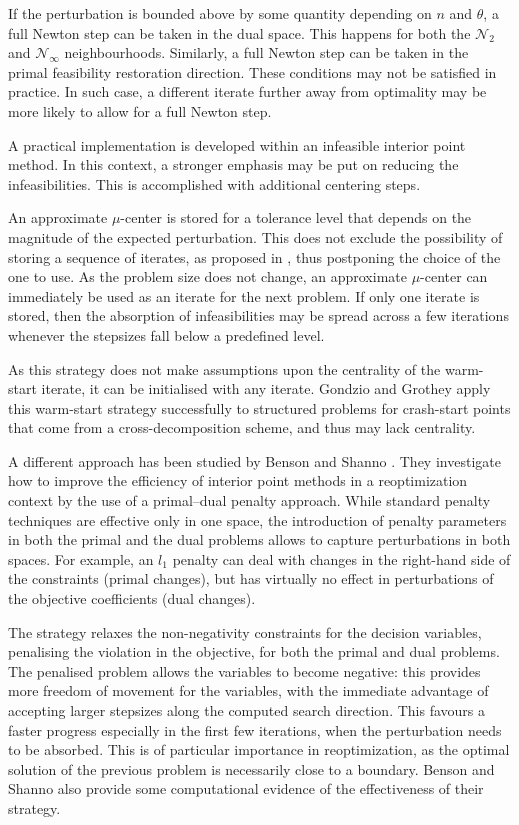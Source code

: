 If the perturbation is bounded above by some quantity depending 
on $n$ and $\theta$, a full Newton step can be taken in the dual space. 
This happens for both the $\mathcal{N}_2$ and $\mathcal{N}_\infty$ 
neighbourhoods. Similarly, a full Newton step can be taken in the 
primal feasibility restoration direction. These conditions may not 
be satisfied in practice. In such case, a different iterate further 
away from optimality may be more likely to allow for a full Newton step.

A practical implementation is developed within an infeasible interior 
point method. In this context, a stronger emphasis may be put on 
reducing the infeasibilities. This is accomplished with additional 
centering steps.

An approximate $\mu$-center is stored for a tolerance level that 
depends on the magnitude of the expected perturbation. This does not 
exclude the possibility of storing a sequence of iterates, as proposed 
in \cite{YildirimWright}, thus postponing the choice of the one to 
use.
As the problem size does not change, an approximate $\mu$-center 
can immediately be used as an iterate for the next problem.
If only one iterate is stored, then the absorption of infeasibilities 
may be spread across a few iterations whenever the stepsizes fall 
below a predefined level.

As this strategy does not make assumptions upon the centrality of the 
warm-start iterate,
it can be initialised with any iterate.
Gondzio and Grothey \cite{GondzioGrothey03} apply this warm-start 
strategy successfully to structured problems for crash-start points that 
come from a cross-decomposition scheme, and thus may lack centrality.

A different approach has been studied by Benson and Shanno 
\cite{BensonShanno}. They investigate how to improve the efficiency 
of interior point methods in a reoptimization context by the use of 
a primal--dual penalty approach.
While standard penalty techniques are effective only in one space, 
the introduction of penalty parameters in both the primal and the 
dual problems allows to capture perturbations in both spaces.
%
For example, an $l_1$ penalty can deal with changes in the right-hand
side of the constraints (primal changes), but has virtually no effect
in perturbations of the objective coefficients (dual changes).

The strategy relaxes the non-negativity constraints for the decision
variables, penalising the violation in the objective, for both
the primal and dual problems.
The penalised problem allows the variables to become negative: 
this provides more freedom of movement for the variables, with
the immediate advantage of accepting larger stepsizes along 
the computed search direction. This favours a faster progress
especially in the first few iterations, when the perturbation needs
to be absorbed.
This is of particular importance in reoptimization, as the optimal
solution of the previous problem is necessarily close to a boundary.
%
Benson and Shanno \cite{BensonShanno} also provide some computational
evidence of the effectiveness of their strategy.

